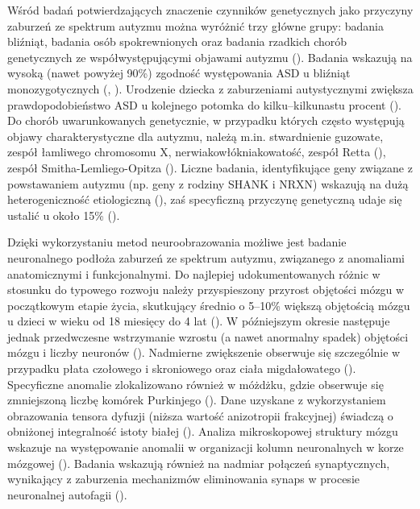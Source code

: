     Wśród badań potwierdzających znaczenie czynników genetycznych jako przyczyny zaburzeń ze spektrum autyzmu można wyróżnić trzy główne grupy: badania bliźniąt, badania osób spokrewnionych oraz badania rzadkich chorób genetycznych ze współwystępującymi objawami autyzmu (\cite{geschwind2011genetics}).
    Badania wskazują na wysoką (nawet powyżej 90\%) zgodność występowania ASD u bliźniąt monozygotycznych (\cite{folstein1977infantile}, \cite{tick2016heritability}).
    Urodzenie dziecka z zaburzeniami autystycznymi zwiększa prawdopodobieństwo ASD u kolejnego potomka do kilku--kilkunastu procent (\cite{ozonoff2011recurrence}).
    Do chorób uwarunkowanych genetycznie, w przypadku których często występują objawy charakterystyczne dla autyzmu, należą m.in. stwardnienie guzowate, zespół łamliwego chromosomu X, nerwiakowłókniakowatość, zespół Retta (\cite{jeste2014disentangling}), zespół Smitha-Lemliego-Opitza (\cite{sikora2006near}).
    Liczne badania, identyfikujące geny związane z powstawaniem autyzmu (np. geny z rodziny SHANK i NRXN) wskazują na dużą heterogeniczność etiologiczną (\cite{yuen2017whole}), zaś specyficzną przyczynę genetyczną udaje się ustalić u około 15\% (\cite{carter2013autism}). 
    
    Dzięki wykorzystaniu metod neuroobrazowania możliwe jest badanie neuronalnego podłoża zaburzeń ze spektrum autyzmu, związanego z anomaliami anatomicznymi i funkcjonalnymi.
    Do najlepiej udokumentowanych różnic w stosunku do typowego rozwoju należy przyspieszony przyrost objętości mózgu w początkowym etapie życia, skutkujący średnio o 5--10\% większą objętością mózgu u dzieci w wieku od 18 miesięcy do 4 lat (\cite{amaral2008neuroanatomy}).
    W późniejszym okresie następuje jednak przedwczesne wstrzymanie wzrostu (a nawet anormalny spadek) objętości mózgu i liczby neuronów (\cite{courchesne2011brain}).
    Nadmierne zwiększenie obserwuje się szczególnie w przypadku płata czołowego i skroniowego oraz ciała migdałowatego (\cite{courchesne2011brain}).
    Specyficzne anomalie zlokalizowano również w móżdżku, gdzie obserwuje się zmniejszoną liczbę komórek Purkinjego (\cite{fatemi2012consensus}).
    Dane uzyskane z wykorzystaniem obrazowania tensora dyfuzji (niższa wartość anizotropii frakcyjnej) świadczą o obniżonej integralność istoty białej (\cite{travers2012diffusion}).
    Analiza mikroskopowej struktury mózgu wskazuje na występowanie anomalii w organizacji kolumn neuronalnych w korze mózgowej (\cite{casanova2006minicolumnar}).
    Badania wskazują również na nadmiar połączeń synaptycznych, wynikający z zaburzenia mechanizmów eliminowania synaps w procesie neuronalnej autofagii (\cite{tang2014loss}). 

